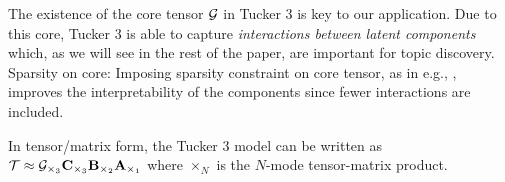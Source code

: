 The existence of the core tensor ${\mathbf{\mathcal{G}}}$ in Tucker 3 is key to our application. Due to this core, Tucker 3 is able to capture {\em interactions between latent components} which, as we will see in the rest of the paper, are important for topic discovery. Sparsity on core: Imposing sparsity constraint on core tensor, as in e.g., \cite{gilpin2016some}, improves the interpretability of the components since fewer interactions are included. 

In tensor/matrix form, the Tucker 3 model can be written as
$
{\mathbf{\mathcal{T}}} \approx {\ensuremath{\mathbf{\mathcal{G}}}}_{\times_{3}} {\mathbf{C}}_{\times_{3}} {\mathbf{B}}_{\times_{2}} {\mathbf{A}}_{\times_{1}}
$
where ${\times_{N}}$ is the $N$-mode tensor-matrix product.
